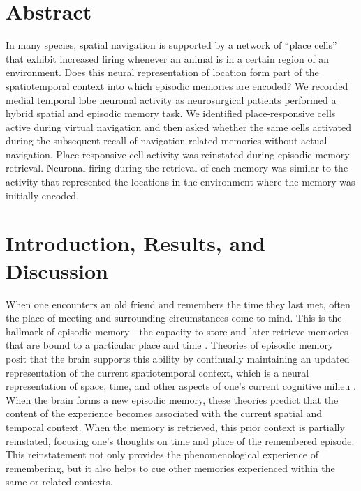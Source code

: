 
\section{Abstract}

In many species, spatial navigation is supported by a network of ``place cells'' that exhibit increased firing whenever an animal is in a certain region of an environment. Does this neural representation of location form part of the spatiotemporal context into which episodic memories are encoded? We recorded medial temporal lobe neuronal activity as neurosurgical patients performed a hybrid spatial and episodic memory task.  We identified place-responsive cells active during virtual navigation and then asked whether the same cells activated during the subsequent recall of navigation-related memories without actual navigation. Place-responsive cell activity was reinstated during episodic memory retrieval. Neuronal firing during the retrieval of each memory was  similar to the activity that represented the locations in the environment  where the memory was initially encoded.


\section{Introduction, Results, and Discussion}
When one encounters an old friend and remembers the time they last met, often the place of meeting and surrounding circumstances come to mind. This is the hallmark of episodic memory---the capacity to store and later retrieve memories that are bound to a particular place and time \cite{Tulv83}.  Theories of episodic memory posit that the brain supports this ability by continually maintaining an updated representation of the current spatiotemporal context, which is a neural representation of space, time, and other aspects of one's current cognitive milieu \cite{PolyKaha08}.  When the brain forms a new episodic memory, these theories predict that the content of the experience becomes associated with the current spatial and temporal context.  When the memory is retrieved, this prior context is partially reinstated, focusing one's thoughts on time and place of the remembered episode. This reinstatement not only provides the phenomenological experience of remembering, but it also helps to cue other memories experienced within the same or related contexts.


